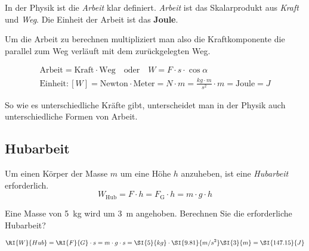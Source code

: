 \documentclass[12pt,a4paper,twoside]{article}
\begin{document}
In der Physik ist die \emph{Arbeit} klar definiert.
\emph{Arbeit} ist das Skalarprodukt aus \emph{Kraft} und \emph{Weg}.
Die Einheit der Arbeit ist das {\bf Joule}.

Um die Arbeit zu berechnen multipliziert man also die Kraftkomponente die parallel zum Weg verläuft mit dem zurückgelegten Weg.


\begin{cbox}
\begin{gather*}
    \text{Arbeit} = \text{Kraft}\cdot{\text{Weg}}\quad\text{oder}\quad W=F\cdot s\cdot \cos \alpha\\
	\text{Einheit}: [W] = \text{Newton}\cdot\text{Meter}=\si{N}\cdot\si{m}=\frac{\si{kg}\cdot\si{m}}{\si{s^2}}\cdot \si{m}=\text{Joule}=\si{J}
\end{gather*}
\end{cbox}





So wie es unterschiedliche Kräfte gibt, unterscheidet man in der Physik auch unterschiedliche Formen von Arbeit.

\subsection*{Hubarbeit}
Um einen Körper der Masse $m$ um eine Höhe $h$ anzuheben, ist eine \emph{Hubarbeit} erforderlich.
\begin{equation*}
	W_{\text{Hub}} = F \cdot h = F_{\text{G}}\cdot h = m\cdot g\cdot h
\end{equation*}



\begin{aufgabe}
	Eine Masse von \SI{5}{kg} wird um \SI{3}{m} angehoben.
	Berechnen Sie die erforderliche Hubarbeit?
	\begin{loesung}
		\begin{eqnarray*}
			\RI{W}{Hub} = \RI{F}{G}\cdot s=m\cdot g\cdot s= \SI{5}{kg}\cdot\SI{9.81}{m/s^2}\SI{3}{m}=\SI{147.15}{J}
		\end{eqnarray*}
	\end{loesung}
\end{aufgabe}
\end{document}
